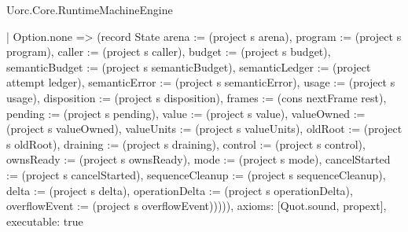 \begin{lexlean}{Uorc.Core.RuntimeMachineEngine}
\begin{semanticmodule}
{      | Option.none => (record State {arena := (project s arena), program := (project s program), caller := (project s caller), budget := (project s budget), semanticBudget := (project s semanticBudget), semanticLedger := (project attempt ledger), semanticError := (project s semanticError), usage := (project s usage), disposition := (project s disposition), frames := (cons nextFrame rest), pending := (project s pending), value := (project s value), valueOwned := (project s valueOwned), valueUnits := (project s valueUnits), oldRoot := (project s oldRoot), draining := (project s draining), control := (project s control), ownsReady := (project s ownsReady), mode := (project s mode), cancelStarted := (project s cancelStarted), sequenceCleanup := (project s sequenceCleanup), delta := (project s delta), operationDelta := (project s operationDelta), overflowEvent := (project s overflowEvent)})))),
  axioms: [Quot.sound, propext],
  executable: true
}


\end{semanticmodule}
\end{lexlean}
